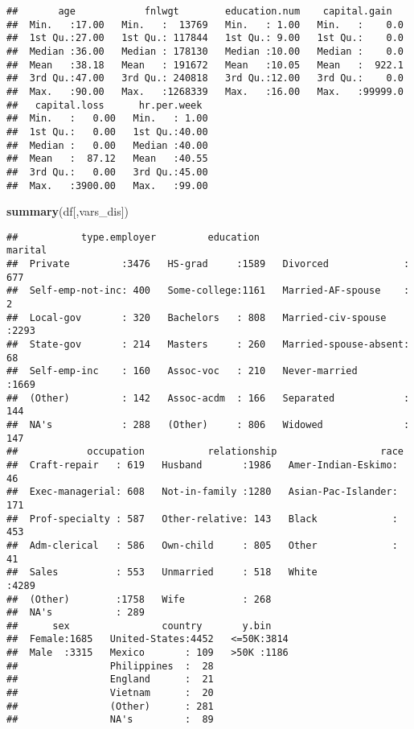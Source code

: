 \documentclass[12pt,]{article}
\newenvironment{Shaded}{\begin{snugshade}}{\end{snugshade}}
\newcommand{\KeywordTok}[1]{\textcolor[rgb]{0.13,0.29,0.53}{\textbf{#1}}}
\newcommand{\NormalTok}[1]{#1}
\begin{document}
\begin{verbatim}
##       age            fnlwgt        education.num    capital.gain    
##  Min.   :17.00   Min.   :  13769   Min.   : 1.00   Min.   :    0.0  
##  1st Qu.:27.00   1st Qu.: 117844   1st Qu.: 9.00   1st Qu.:    0.0  
##  Median :36.00   Median : 178130   Median :10.00   Median :    0.0  
##  Mean   :38.18   Mean   : 191672   Mean   :10.05   Mean   :  922.1  
##  3rd Qu.:47.00   3rd Qu.: 240818   3rd Qu.:12.00   3rd Qu.:    0.0  
##  Max.   :90.00   Max.   :1268339   Max.   :16.00   Max.   :99999.0  
##   capital.loss      hr.per.week   
##  Min.   :   0.00   Min.   : 1.00  
##  1st Qu.:   0.00   1st Qu.:40.00  
##  Median :   0.00   Median :40.00  
##  Mean   :  87.12   Mean   :40.55  
##  3rd Qu.:   0.00   3rd Qu.:45.00  
##  Max.   :3900.00   Max.   :99.00
\end{verbatim}

\begin{Shaded}
\begin{Highlighting}[]
\KeywordTok{summary}\NormalTok{(df[,vars_dis])}
\end{Highlighting}
\end{Shaded}

\begin{verbatim}
##           type.employer         education                     marital    
##  Private         :3476   HS-grad     :1589   Divorced             : 677  
##  Self-emp-not-inc: 400   Some-college:1161   Married-AF-spouse    :   2  
##  Local-gov       : 320   Bachelors   : 808   Married-civ-spouse   :2293  
##  State-gov       : 214   Masters     : 260   Married-spouse-absent:  68  
##  Self-emp-inc    : 160   Assoc-voc   : 210   Never-married        :1669  
##  (Other)         : 142   Assoc-acdm  : 166   Separated            : 144  
##  NA's            : 288   (Other)     : 806   Widowed              : 147  
##            occupation           relationship                  race     
##  Craft-repair   : 619   Husband       :1986   Amer-Indian-Eskimo:  46  
##  Exec-managerial: 608   Not-in-family :1280   Asian-Pac-Islander: 171  
##  Prof-specialty : 587   Other-relative: 143   Black             : 453  
##  Adm-clerical   : 586   Own-child     : 805   Other             :  41  
##  Sales          : 553   Unmarried     : 518   White             :4289  
##  (Other)        :1758   Wife          : 268                            
##  NA's           : 289                                                  
##      sex                country       y.bin     
##  Female:1685   United-States:4452   <=50K:3814  
##  Male  :3315   Mexico       : 109   >50K :1186  
##                Philippines  :  28               
##                England      :  21               
##                Vietnam      :  20               
##                (Other)      : 281               
##                NA's         :  89
\end{verbatim}
\end{document}
